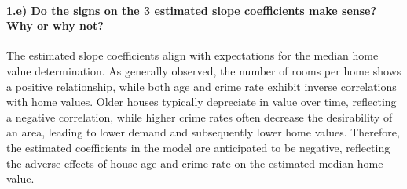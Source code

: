 \documentclass[
  letterpaper,
  DIV=11,
  numbers=noendperiod]{scrartcl}
\let\oldparagraph\paragraph
\renewcommand{\paragraph}[1]{\oldparagraph{#1}\mbox{}}
\begin{document}
\hypertarget{e-do-the-signs-on-the-3-estimated-slope-coefficients-make-sense-why-or-why-not}{%
\paragraph{1.e) Do the signs on the 3 estimated slope coefficients make
sense? Why or why
not?}\label{e-do-the-signs-on-the-3-estimated-slope-coefficients-make-sense-why-or-why-not}}

The estimated slope coefficients align with expectations for the median
home value determination. As generally observed, the number of rooms per
home shows a positive relationship, while both age and crime rate
exhibit inverse correlations with home values. Older houses typically
depreciate in value over time, reflecting a negative correlation, while
higher crime rates often decrease the desirability of an area, leading
to lower demand and subsequently lower home values. Therefore, the
estimated coefficients in the model are anticipated to be negative,
reflecting the adverse effects of house age and crime rate on the
estimated median home value.
\end{document}
